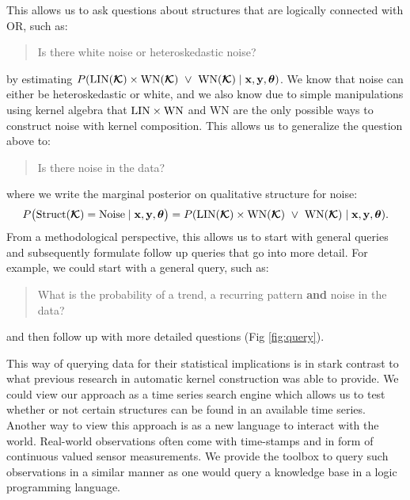 This allows us to ask questions about structures that are logically connected with OR, such as:
\begin{quotation}
Is there white noise or heteroskedastic noise?
\end{quotation}
by estimating $P(\text{LIN}(\bm{\mathcal{K}}) \times \text{WN}(\bm{\mathcal{K}})\;\;{\large\lor}\;\; \text{WN}(\bm{\mathcal{K}}) \mid
\mathbf{x}, \mathbf{y}, \bm{\theta})$.
We know that noise can either be heteroskedastic or white,
and we also know due to simple manipulations using kernel algebra
that  $\text{LIN} \times \text{WN}$ and $\text{WN}$ are the only possible ways to
construct noise with kernel composition. This allows us to generalize the 
question above to:
\begin{quotation}
Is there noise in the data? 
\end{quotation}
where we write the marginal posterior on qualitative structure for noise:
\begin{equation}
P\big(\text{Struct}(\bm{\mathcal{K}})=\text{Noise} \mid \mathbf{x}, \mathbf{y}, \bm{\theta}\big) = P(\text{LIN}(\bm{\mathcal{K}}) \times
\text{WN}(\bm{\mathcal{K}})\;\;{\large\lor}\;\; \text{WN}(\bm{\mathcal{K}}) \mid \mathbf{x}, \mathbf{y}, \bm{\theta}).
\end{equation}
From a methodological perspective, this allows us to start with general queries and 
subsequently formulate follow up queries that go into more detail.
For example, we could start with a general query, such as:
\begin{quotation}
What is the probability of a trend, a recurring pattern {\bf and} noise in the data?
\end{quotation}
and then follow up with more detailed questions (Fig \ref{fig:query}).

This way of querying data for their statistical implications is in stark contrast to what previous research in automatic kernel construction was able to provide.
We could view our approach as a time series search engine which allows us to test whether or not certain structures can be found
in an available time series.
Another way to view this approach is as a new language to interact with the world.
Real-world observations often come with time-stamps and in form
of continuous valued sensor measurements.  
We provide the toolbox to query such observations in a similar manner as
one would query a knowledge base in a logic programming language.






